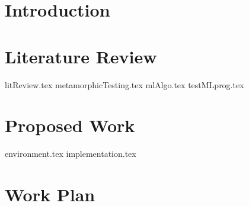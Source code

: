 \documentclass[print,ms]{style/unothesis}
\begin{document}
	\chapter{Introduction}

	\chapter{Literature Review}
  {litReview.tex}
	{metamorphicTesting.tex}
	{mlAlgo.tex}
	{testMLprog.tex}

	\chapter{Proposed Work}
	{environment.tex}
	{implementation.tex}

	\chapter{Work Plan}


\backmatter

\appendix



	\nocite{*}
	
	
\end{document}
